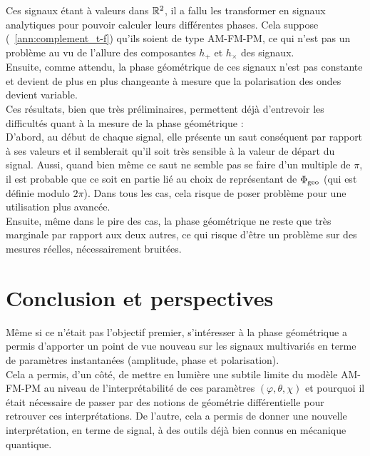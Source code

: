 Ces signaux étant à valeurs dans $\mathbb{R}^2$, il a fallu les transformer en signaux analytiques pour pouvoir calculer leurs différentes phases. Cela suppose (\cf~\ref{ann:complement_t-f}) qu'ils soient de type AM-FM-PM, ce qui n'est pas un problème au vu de l'allure des composantes $h_+$ et $h_\times$ des signaux.
\\
Ensuite, comme attendu, la phase géométrique de ces signaux n'est pas constante et devient de plus en plus changeante à mesure que la polarisation des ondes devient variable.
\\

Ces résultats, bien que très préliminaires, permettent déjà d'entrevoir les difficultés quant à la mesure de la phase géométrique :
\\
D'abord, au début de chaque signal, elle présente un saut conséquent par rapport à ses valeurs et il semblerait qu'il soit très sensible à la valeur de départ du signal. Aussi, quand bien même ce saut ne semble pas se faire d'un multiple de $\pi$, il est probable que ce soit en partie lié au choix de représentant de $\Phi_{\text{\normalfont geo}}$ (qui est définie modulo $2\pi$).
Dans tous les cas, cela risque de poser problème pour une utilisation plus avancée.
\\
Ensuite, même dans le pire des cas, la phase géométrique ne reste que très marginale par rapport aux deux autres, ce qui risque d'être un problème sur des mesures réelles, nécessairement bruitées.
\\




\section{Conclusion et perspectives}

Même si ce n'était pas l'objectif premier, s’intéresser à la phase géométrique a permis d'apporter un point de vue nouveau sur les signaux multivariés en terme de paramètres instantanées (amplitude, phase et polarisation). 
\\
Cela a permis, d'un côté, de mettre en lumière une subtile limite du modèle AM-FM-PM au niveau de l'interprétabilité de ces paramètres $(\varphi, \theta, \chi)$ et pourquoi il était nécessaire de passer par des notions de géométrie différentielle pour retrouver ces interprétations. 
De l'autre, cela a permis de donner une nouvelle interprétation, en terme de signal, à des outils déjà bien connus en mécanique quantique.
\\

